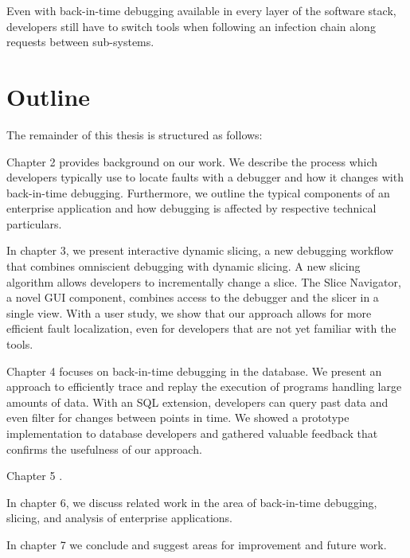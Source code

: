 
Even with back-in-time debugging available in every layer of the software stack, developers still have to switch tools when following an infection chain along requests between sub-systems.

\section{Outline}

The remainder of this thesis is structured as follows:

Chapter 2 provides background on our work.
We describe the process which developers typically use to locate faults with a debugger and how it changes with back-in-time debugging.
Furthermore, we outline the typical components of an enterprise application and how debugging is affected by respective technical particulars.

In chapter 3, we present interactive dynamic slicing, a new debugging workflow that combines omniscient debugging with dynamic slicing.
A new slicing algorithm allows developers to incrementally change a slice. 
The Slice Navigator, a novel GUI component, combines access to the debugger and the slicer in a single view.
With a user study, we show that our approach allows for more efficient fault localization, even for developers that are not yet familiar with the tools.

Chapter 4 focuses on back-in-time debugging in the database.
We present an approach to efficiently trace and replay the execution of programs handling large amounts of data.
With an SQL extension, developers can query past data and even filter for changes between points in time.
We showed a prototype implementation to database developers and gathered valuable feedback that confirms the usefulness of our approach.

Chapter 5 .

In chapter 6, we discuss related work in the area of back-in-time debugging, slicing, and analysis of enterprise applications.

In chapter 7 we conclude and suggest areas for improvement and future work.


